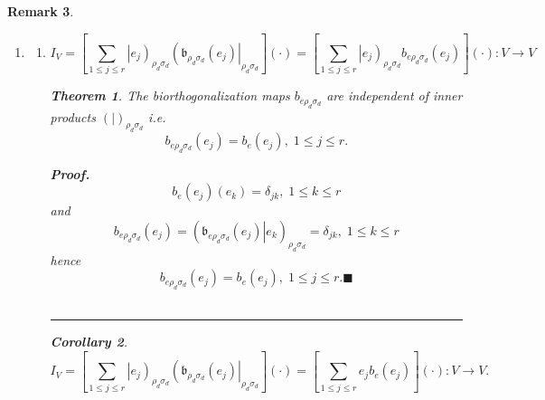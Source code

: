\documentclass[aps,preprint]{revtex4}
\newtheorem{theorem}{Theorem}
\newtheorem{corollary}[theorem]{Corollary}
\newtheorem{remark}[theorem]{Remark}
\newenvironment{proof}[1][Proof]{\noindent\textbf{#1.} }{\ \rule{0.5em}{0.5em}}
\begin{document}
\begin{remark}
\begin{enumerate}
\item 
\begin{enumerate}
\item 
\begin{equation}
I_{V}=\left[ \sum_{1\leq j\leq r}\left\vert e_{j}\right) _{\rho _{d}\sigma
_{d}}\left( \mathfrak{b}_{\rho _{d}\sigma _{d}}\left( e_{j}\right)
\right\vert _{\rho _{d}\sigma _{d}}\right] \left( \cdot \right) =\left[
\sum_{1\leq j\leq r}\left\vert e_{j}\right) _{\rho _{d}\sigma _{d}}b_{e\rho
_{d}\sigma _{d}}\left( e_{j}\right) \right] \left( \cdot \right)
:V\rightarrow V
\end{equation}

\begin{theorem}
The biorthogonalization maps $b_{e\rho _{d}\sigma _{d}}$ are independent of
inner products $\left( \left. {}\right\vert \right) _{\rho _{d}\sigma _{d}}$
i.e. 
\begin{equation}
b_{e\rho _{d}\sigma _{d}}\left( e_{j}\right) =b_{e}\left( e_{j}\right)
,\;1\leq j\leq r.
\end{equation}
\end{theorem}

\begin{proof}
\begin{equation}
b_{e}\left( e_{j}\right) \left( e_{k}\right) =\delta _{jk},\;1\leq k\leq r
\end{equation}%
and 
\begin{equation}
b_{e\rho _{d}\sigma _{d}}\left( e_{j}\right) =\left( \left. \mathfrak{b}%
_{e\rho _{d}\sigma _{d}}\left( e_{j}\right) \right\vert e_{k}\right) _{\rho
_{d}\sigma _{d}}=\delta _{jk},\;1\leq k\leq r
\end{equation}%
hence 
\begin{equation}
b_{e\rho _{d}\sigma _{d}}\left( e_{j}\right) =b_{e}\left( e_{j}\right)
,\;1\leq j\leq r.\blacksquare
\end{equation}
\end{proof}

\begin{corollary}
\begin{equation}
I_{V}=\left[ \sum_{1\leq j\leq r}\left\vert e_{j}\right) _{\rho _{d}\sigma
_{d}}\left( \mathfrak{b}_{\rho _{d}\sigma _{d}}\left( e_{j}\right)
\right\vert _{\rho _{d}\sigma _{d}}\right] \left( \cdot \right) =\left[
\sum_{1\leq j\leq r}e_{j}b_{e}\left( e_{j}\right) \right] \left( \cdot
\right) :V\rightarrow V.
\end{equation}
\end{corollary}


\end{enumerate}
\end{enumerate}
\end{remark}
\end{document}
